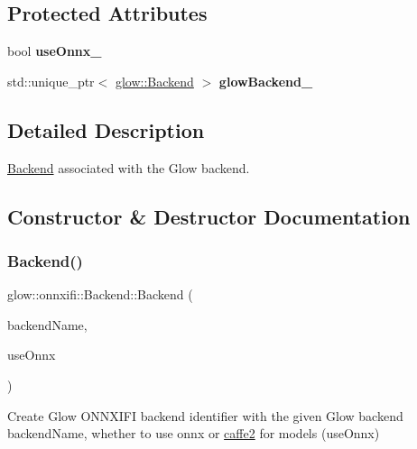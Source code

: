 \subsection*{Protected Attributes}
\begin{DoxyCompactItemize}
\item 
\mbox{\label{classglow_1_1onnxifi_1_1_backend_adb2828da672ee265628c74f56175de8e}} 
bool {\bfseries use\+Onnx\+\_\+}
\item 
\mbox{\label{classglow_1_1onnxifi_1_1_backend_aa25a130aff57731440016a19c9d14db3}} 
std\+::unique\+\_\+ptr$<$ \hyperlink{classglow_1_1_backend}{glow\+::\+Backend} $>$ {\bfseries glow\+Backend\+\_\+}
\end{DoxyCompactItemize}


\subsection{Detailed Description}
\hyperlink{classglow_1_1onnxifi_1_1_backend}{Backend} associated with the Glow backend. 

\subsection{Constructor \& Destructor Documentation}
\mbox{\label{classglow_1_1onnxifi_1_1_backend_a6a036bd2e229fb03eac9e0d95441ba7b}} 
\subsubsection{\texorpdfstring{Backend()}{Backend()}}
{\footnotesize\ttfamily glow\+::onnxifi\+::\+Backend\+::\+Backend (\begin{DoxyParamCaption}\item[{llvm\+::\+String\+Ref}]{backend\+Name,  }\item[{bool}]{use\+Onnx }\end{DoxyParamCaption})\hspace{0.3cm}{\ttfamily [inline]}}

Create Glow O\+N\+N\+X\+I\+FI backend identifier with the given Glow backend {\ttfamily backend\+Name}, whether to use onnx or \hyperlink{namespacecaffe2}{caffe2} for models ({\ttfamily use\+Onnx}) 

